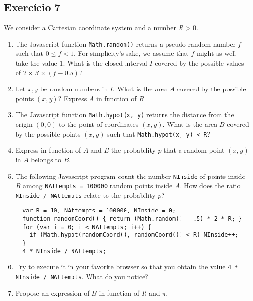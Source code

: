 \subsection*{Exercício 7}

We consider a Cartesian coordinate system and a number $R > 0$.

\begin{enumerate}

\item The Javascript function {\tt Math.random()} returns a
  pseudo-random number $f$ such that $0 \leq f < 1$. For simplicity's sake, we
  assume that $f$ might as well take the value $1$. What is the closed
  interval $I$
  covered by the possible values of $2 \times R \times \left(f - 0.5\right)$?

\item Let $x, y$ be random numbers in $I$. What is the area $A$ covered by
  the possible points $(x,y)$? Express $A$ in function of $R$.

\item The Javascript function {\tt Math.hypot(x, y)} returns the distance
  from the origin $(0,0)$ to the point of coordinates $(x, y)$.
  What is the area $B$ covered by the possible points $(x,y)$ such that
  {\tt Math.hypot(x, y) < R}?

\item Express in function of $A$ and $B$ the probability $p$ that a random
  point $(x,y)$ in $A$ belongs to $B$.

\item The following Javascript program count the number {\tt NInside} of
  points inside $B$ among
  {\tt NAttempts = 100000} random points inside $A$.
  How does the ratio {\tt NInside / NAttempts} relate to the probability $p$?

\begin{lstlisting}
  var R = 10, NAttempts = 100000, NInside = 0;
  function randomCoord() { return (Math.random() - .5) * 2 * R; }
  for (var i = 0; i < NAttempts; i++) {
    if (Math.hypot(randomCoord(), randomCoord()) < R) NInside++;
  }
  4 * NInside / NAttempts;
\end{lstlisting}

\item Try to execute it in your favorite browser so that you obtain the
  value {\tt 4 * NInside / NAttempts}. What do you notice?

\item Propose an expression of $B$ in function of $R$ and $\pi$.

\end{enumerate}

